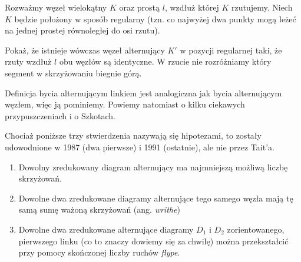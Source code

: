 \documentclass{article}
\begin{document}
\begin{problem}
  Rozważmy węzeł wielokątny $K$ oraz prostą $l$, wzdłuż której $K$ rzutujemy. Niech $K$ będzie położony w sposób regularny (tzn. co najwyżej dwa punkty mogą leżeć na jednej prostej równoległej do osi rzutu). 

  Pokaż, że istnieje wówczas węzeł alternujący $K'$ w pozycji regularnej taki, że rzuty wzdłuż $l$ obu węzłów są identyczne. W rzucie nie rozróżniamy który segment w skrzyżowaniu biegnie górą.
  
\end{problem}
%

Definicja bycia alternującym linkiem jest analogiczna jak bycia alternującym węzłem, więc ją pominiemy. Powiemy natomiast o kilku ciekawych przypuszczeniach i o Szkotach. %

\begin{thm}
  Chociaż poniższe trzy stwierdzenia nazywają się hipotezami, to zostały udowodnione w 1987 (dwa pierwsze) i 1991 (ostatnie), ale nie przez Tait'a.
  \begin{enumerate}
    \item Dowolny zredukowany diagram alternujący ma najmniejszą możliwą liczbę skrzyżowań.
    \item Dowolne dwa zredukowane diagramy alternujące tego samego węzła mają tę samą sumę ważoną skrzyżowań (ang. \emph{writhe})
    \item Dowolne dwa zredukowane alternujące diagramy $D_1$ i $D_2$ zorientowanego, pierwszego linku (co to znaczy dowiemy się za chwilę) można przekształcić przy pomocy skończonej liczby ruchów \emph{flype}.
  \end{enumerate}
\end{thm}
\end{document}
